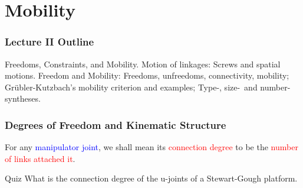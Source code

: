 \section{Mobility}

\begin{frame}
	\frametitle{Lecture II Outline}
	\begin{tcolorbox}[coltitle=yellow!50!black,colframe=magenta!25,split=.2,title=Freedom and Structure]
		Freedoms, Constraints, and Mobility.
		\tcblower
		Motion of linkages: Screws and spatial motions.
		\vspace{.2cm}
		\newline
		Freedom and Mobility: Freedoms, unfreedoms, connectivity, mobility;
		\vspace{.2cm}
		\newline
		Gr{\"u}bler-Kutzbach's mobility criterion and examples;
		\vspace{.2cm}
		\newline
		Type-, size-\, and number-syntheses.
	\end{tcolorbox}
\end{frame}
 


\begin{frame}
	\frametitle{Degrees of Freedom and Kinematic Structure}
	\begin{definition}
		For any  \textcolor{blue}{manipulator joint}, we shall mean its \textcolor{red}{connection degree} to be the \textcolor{red}{number of links attached it}.
	\end{definition}
	\begin{block}{Quiz}
		What is the connection degree of the u-joints of a Stewart-Gough platform.
	\end{block}
\end{frame}

